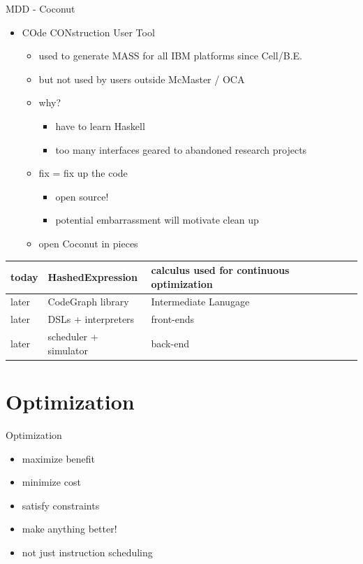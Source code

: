 \documentclass[presentation]{beamer}
\begin{document}
\begin{frame}{MDD - Coconut}
\begin{itemize}
\item COde CONstruction User Tool
  \begin{itemize}
  \item used to generate MASS for all IBM platforms since Cell/B.E.
  \item but not used by users outside McMaster / OCA
  \item why?
    \begin{itemize}
    \item have to learn Haskell
    \item too many interfaces geared to abandoned research projects
    \end{itemize}
  \item fix = fix up the code
    \begin{itemize}
    \item open source!
    \item potential embarrassment will motivate clean up
    \end{itemize}
  \item open Coconut in pieces
  \end{itemize}
\end{itemize}
    \begin{tabular}{|l|l|l|}
    \hline
     today &  HashedExpression & calculus used for continuous optimization \\
    \hline
     later &  CodeGraph library & Intermediate Lanugage \\
    \hline
     later &  DSLs + interpreters &  front-ends \\
    \hline
     later &  scheduler + simulator & back-end \\
    \hline
    \end{tabular}
\end{frame}


\section{Optimization}
\label{sec:org49ebdff}
\begin{frame}[label={sec:orgd027c63}]{Optimization}
  \begin{itemize}
  \item maximize benefit
  \item minimize cost
  \item satisfy constraints
  \item make anything better!
  \item not just instruction scheduling
  \end{itemize}
\end{frame}
\end{document}
